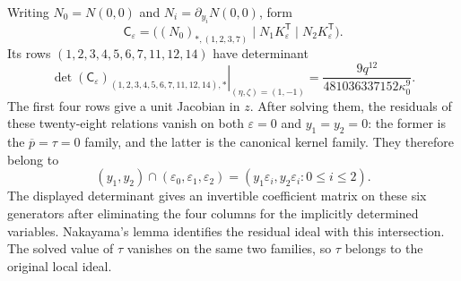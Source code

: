 \documentclass[11pt,a4paper]{article}
\numberwithin{equation}{section}
\theoremstyle{plain}
\theoremstyle{definition}
\theoremstyle{remark}
\begin{document}
Writing $N_0=N(0,0)$ and $N_i=\partial_{y_i}N(0,0)$, form
\[
 \mathsf C_\varepsilon=
 \bigl((N_0)_{*,(1,2,3,7)}\mid
           N_1K_\varepsilon^{\mathsf T}\mid
           N_2K_\varepsilon^{\mathsf T}\bigr).
\]
Its rows $(1,2,3,4,5,6,7,11,12,14)$ have determinant
\[
 \left.\det(\mathsf C_\varepsilon)_{(1,2,3,4,5,6,7,11,12,14),*}
 \right|_{(\eta,\zeta)=(1,-1)}
       =\frac{9q^{12}}{481036337152\kappa_0^9}.
\]
The first four rows give a unit Jacobian in $z$. After solving them,
the residuals of these twenty-eight relations vanish on both
$\varepsilon=0$ and $y_1=y_2=0$:
the former is the $\overline p=\tau=0$ family, and the latter is the
canonical kernel family. They therefore belong to
\[
 (y_1,y_2)\cap(\varepsilon_0,\varepsilon_1,\varepsilon_2)
   =(y_1\varepsilon_i,y_2\varepsilon_i:0\le i\le2).
\]
The displayed determinant gives an invertible coefficient matrix on
these six generators after eliminating the four columns for the implicitly determined variables.
Nakayama's lemma identifies the residual ideal with this intersection.
The solved value of $\tau$ vanishes on the same two families, so
$\tau$ belongs to the original local ideal.
\end{document}
